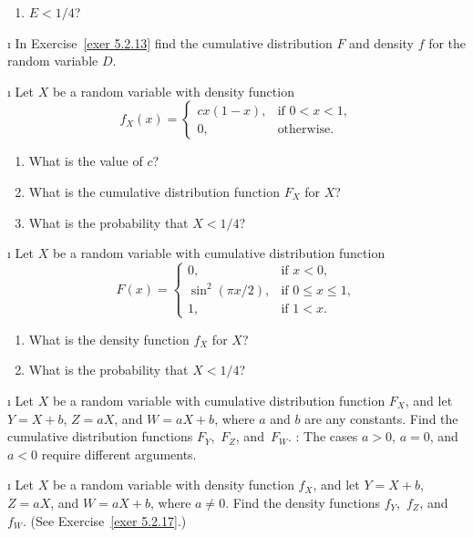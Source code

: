 \begin{LJSItem}
\begin{enumerate}
\item $E < 1/4$?
\end{enumerate}

\i\label{exer 5.2.14} In Exercise~\ref{exer 5.2.13} find the cumulative distribution $F$ and
density $f$ for the random variable $D$.

\i\label{5.2.15} Let $X$ be a random variable with density function
$$ f_X(x) = \left \{ \begin{array}{ll}
                cx(1 - x), & \mbox{if $0 < x < 1$}, \\
                        0, & \mbox{otherwise.}
                  \end{array}
         \right.
$$
\begin{enumerate}
\item What is the value of $c$?

\item What is the cumulative distribution function $F_X$ for $X$?

\item What is the probability that $X < 1/4$?
\end{enumerate}

\i\label{5.2.16} Let $X$ be a random variable with cumulative distribution function
$$ F(x) =  \left \{ \begin{array}{ll}
                            0, & \mbox{if $x < 0$}, \\
              \sin^2(\pi x/2), & \mbox{if $0 \leq x \leq 1$},  \\
                            1, & \mbox{if $1 < x$}.
                 \end{array}
        \right.
$$
\begin{enumerate}
\item What is the density function $f_X$ for $X$?

\item What is the probability that $X < 1/4$?
\end{enumerate}

\i\label{exer 5.2.17} Let $X$ be a random variable with cumulative distribution function
$F_X$, and let $Y = X + b$, $Z = aX$, and $W = aX + b$, where $a$ and $b$ are any
constants.  Find the cumulative distribution functions $F_Y$,~$F_Z$, and~$F_W$.   :
The cases $a > 0$, $a = 0$, and $a < 0$ require different arguments.

\i\label{exer 5.2.18} Let $X$ be a random variable with density function $f_X$, and
let $Y = X + b$, $Z = aX$, and $W = aX + b$, where $a \ne 0$.  Find the density functions $f_Y$,~$f_Z$,
and~$f_W$.  (See Exercise~\ref{exer 5.2.17}.)


\end{LJSItem}
